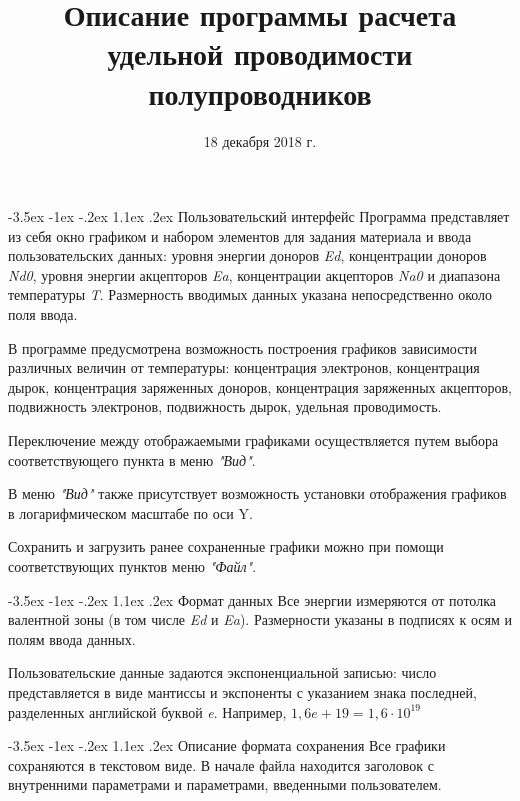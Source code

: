 \documentclass[12pt,a4paper]{extarticle}
\title{Описание программы расчета удельной проводимости полупроводников}
\date{18 декабря 2018 г.}
\makeatletter
\renewcommand\section{\@startsection{section}{1}{\z@}%
	{-3.5ex \@plus -1ex \@minus -.2ex}%
	{1.1ex \@plus.2ex}%
	{\normalfont\normalfont\bfseries}}%
\makeatother
\begin{document}
\maketitle

\section{Пользовательский интерфейс}
Программа представляет из себя окно графиком и набором элементов для задания материала и ввода пользовательских данных: уровня энергии доноров \textit{Ed}, концентрации доноров \textit{Nd0}, уровня энергии акцепторов \textit{Ea}, концентрации акцепторов \textit{Na0} и диапазона температуры \textit{T}. Размерность вводимых данных указана непосредственно около поля ввода.

В программе предусмотрена возможность построения графиков зависимости различных величин от температуры: концентрация электронов, концентрация дырок, концентрация заряженных доноров, концентрация заряженных акцепторов, подвижность электронов, подвижность дырок, удельная проводимость.

Переключение между отображаемыми графиками осуществляется путем выбора соответствующего пункта в меню \textit{"Вид"}.

В меню \textit{"Вид"} также присутствует возможность установки отображения графиков в логарифмическом масштабе по оси Y.

Сохранить и загрузить ранее сохраненные графики можно при помощи соответствующих пунктов меню \textit{"Файл"}.

\section{Формат данных}
Все энергии измеряются от потолка валентной зоны (в том числе \textit{Ed} и \textit{Ea}). Размерности указаны в подписях к осям и полям ввода данных.

Пользовательские данные задаются экспоненциальной записью: число представляется в виде мантиссы и экспоненты с указанием знака последней, разделенных английской буквой \textit{e}. Например, $1,6e+19 = 1,6 \cdot 10^{19}$

\section{Описание формата сохранения}
Все графики сохраняются в текстовом виде. В начале файла находится заголовок с внутренними параметрами и параметрами, введенными пользователем.
\end{document}
